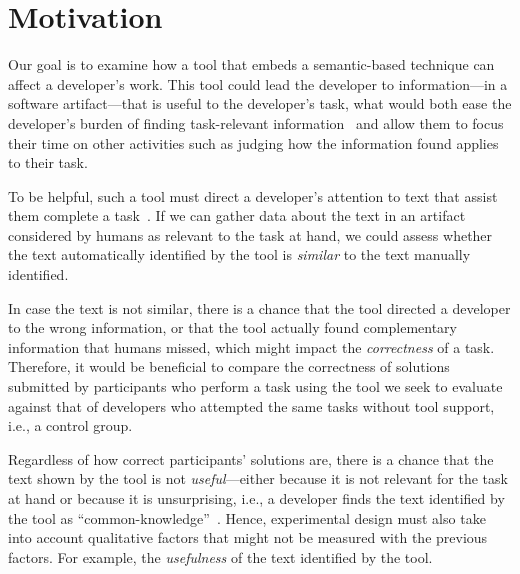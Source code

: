 


\section{Motivation}
\label{cp6:method}



Our goal is to examine how a tool that embeds a semantic-based technique can affect a developer's work.
This tool could lead the developer to information---in a software artifact---that is useful to the developer's task,
what would both ease the developer's burden of finding task-relevant information~\cite{Robillard2015}
and allow them to focus their time on other activities such as judging how the information found applies to their task.





To be helpful, such a tool must direct a developer's attention to text that assist them complete a task~\cite{Robillard2015}. If we can gather data about the text in an artifact considered by humans as relevant to the task at hand, we could assess whether the text automatically identified by the tool is \textit{similar} to the text manually identified. 


In case the text is not similar,
there is a chance that the tool directed a developer to the wrong information, or that 
the tool actually found complementary information that humans missed, which might impact the \textit{correctness} of a task. Therefore, it would be beneficial to compare the correctness of solutions submitted by participants who perform a task using the
tool we seek to evaluate against that of developers who attempted the same tasks without tool support, i.e., a control group.


Regardless of how correct participants' solutions are, there is a chance that the text shown by the tool is not \textit{useful}---either because it is not relevant for the task at hand or because it is unsurprising, i.e., 
a developer finds the text identified by the tool as ``common-knowledge''~\cite{cwalina2008, Robillard2015}. Hence, experimental design must also take into account qualitative factors 
that might not be measured with the previous factors. For example, the \textit{usefulness} of the text identified by the tool. 




